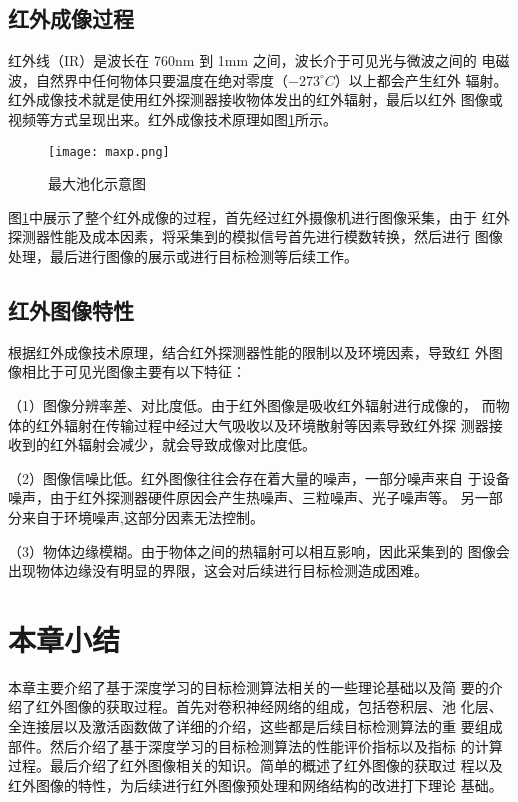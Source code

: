 \subsection{红外成像过程}
红外线（IR）是波长在 760nm 到 1mm 之间，波长介于可见光与微波之间的
电磁波，自然界中任何物体只要温度在绝对零度（$-273 ^{\circ}C$）以上都会产生红外
辐射。红外成像技术就是使用红外探测器接收物体发出的红外辐射，最后以红外
图像或视频等方式呈现出来。红外成像技术原理如图\ref{infra}所示\cite{倪国强2008中国红外成像技术发展的若干思考}。

\begin{figure}[htbp]
    \centering
    \texttt{[image: maxp.png]}
    \caption{最大池化示意图}
    \label{infra}
\end{figure}

图\ref{infra}中展示了整个红外成像的过程，首先经过红外摄像机进行图像采集，由于
红外探测器性能及成本因素，将采集到的模拟信号首先进行模数转换，然后进行
图像处理，最后进行图像的展示或进行目标检测等后续工作。

\subsection{红外图像特性} 
根据红外成像技术原理，结合红外探测器性能的限制以及环境因素，导致红
外图像相比于可见光图像主要有以下特征：

（1）图像分辨率差、对比度低。由于红外图像是吸收红外辐射进行成像的，
而物体的红外辐射在传输过程中经过大气吸收以及环境散射等因素导致红外探
测器接收到的红外辐射会减少，就会导致成像对比度低。

（2）图像信噪比低。红外图像往往会存在着大量的噪声，一部分噪声来自
于设备噪声，由于红外探测器硬件原因会产生热噪声、三粒噪声、光子噪声等。
另一部分来自于环境噪声,这部分因素无法控制。

（3）物体边缘模糊。由于物体之间的热辐射可以相互影响，因此采集到的
图像会出现物体边缘没有明显的界限，这会对后续进行目标检测造成困难。

\section{本章小结}
本章主要介绍了基于深度学习的目标检测算法相关的一些理论基础以及简
要的介绍了红外图像的获取过程。首先对卷积神经网络的组成，包括卷积层、池
化层、全连接层以及激活函数做了详细的介绍，这些都是后续目标检测算法的重
要组成部件。然后介绍了基于深度学习的目标检测算法的性能评价指标以及指标
的计算过程。最后介绍了红外图像相关的知识。简单的概述了红外图像的获取过
程以及红外图像的特性，为后续进行红外图像预处理和网络结构的改进打下理论
基础。
